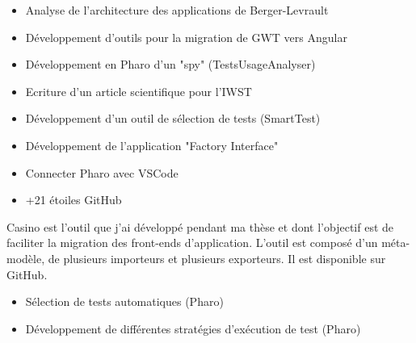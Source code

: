 \documentclass[10pt,a4paper,ragged2e,withhyper]{altacv}
\begin{document}
\divider

\begin{itemize}
\item Analyse de l’architecture des applications de Berger-Levrault
\item Développement d'outils pour la migration de GWT vers Angular
\end{itemize}

\divider

\begin{itemize}
  \item Développement en Pharo d'un "spy" (TestsUsageAnalyser)
  \item Ecriture d'un article scientifique pour l'IWST
  \item Développement d'un outil de sélection de tests (SmartTest)
\end{itemize}

\divider

\begin{itemize}
  \item Développement de l'application "Factory Interface"
\end{itemize}



\begin{itemize}
\item Connecter Pharo avec VSCode
\item +21 étoiles GitHub
\end{itemize}

\divider


Casino est l'outil que j'ai développé pendant ma thèse et dont l'objectif est de faciliter la migration des front-ends d'application.
L'outil est composé d'un méta-modèle, de plusieurs importeurs et plusieurs exporteurs.
Il est disponible sur GitHub.

\divider

\begin{itemize}
\item Sélection de tests automatiques (Pharo)
\item Développement de différentes stratégies d’exécution de test (Pharo)
\end{itemize}
\end{document}
